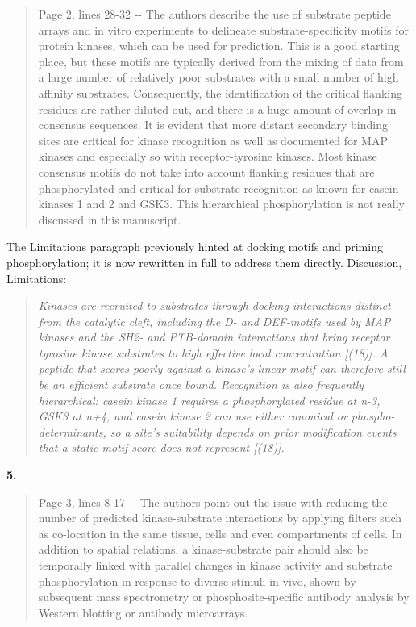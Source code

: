 \documentclass[
]{article}
\begin{document}
\begin{quote}
Page 2, lines 28-32 -\/- The authors describe the use of substrate
peptide arrays and in vitro experiments to delineate
substrate-specificity motifs for protein kinases, which can be used for
prediction. This is a good starting place, but these motifs are
typically derived from the mixing of data from a large number of
relatively poor substrates with a small number of high affinity
substrates. Consequently, the identification of the critical flanking
residues are rather diluted out, and there is a huge amount of overlap
in consensus sequences. It is evident that more distant secondary
binding sites are critical for kinase recognition as well as documented
for MAP kinases and especially so with receptor-tyrosine kinases. Most
kinase consensus motifs do not take into account flanking residues that
are phosphorylated and critical for substrate recognition as known for
casein kinases 1 and 2 and GSK3. This hierarchical phosphorylation is
not really discussed in this manuscript.
\end{quote}

The Limitations paragraph previously hinted at docking motifs and
priming phosphorylation; it is now rewritten in full to address them
directly. Discussion, Limitations:

\begin{quote}
\emph{Kinases are recruited to substrates through docking interactions
distinct from the catalytic cleft, including the D- and DEF-motifs used
by MAP kinases and the SH2- and PTB-domain interactions that bring
receptor tyrosine kinase substrates to high effective local
concentration {[}(18){]}. A peptide that scores poorly against a
kinase's linear motif can therefore still be an efficient substrate once
bound. Recognition is also frequently hierarchical: casein kinase 1
requires a phosphorylated residue at n-3, GSK3 at n+4, and casein kinase
2 can use either canonical or phospho-determinants, so a site's
suitability depends on prior modification events that a static motif
score does not represent {[}(18){]}.}
\end{quote}

\textbf{5.}

\begin{quote}
Page 3, lines 8-17 -\/- The authors point out the issue with reducing
the number of predicted kinase-substrate interactions by applying
filters such as co-location in the same tissue, cells and even
compartments of cells. In addition to spatial relations, a
kinase-substrate pair should also be temporally linked with parallel
changes in kinase activity and substrate phosphorylation in response to
diverse stimuli in vivo, shown by subsequent mass spectrometry or
phosphosite-specific antibody analysis by Western blotting or antibody
microarrays.
\end{quote}
\end{document}
